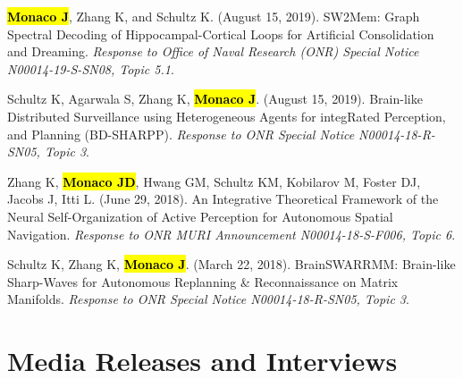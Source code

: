 \documentclass[10pt]{article}
\newcommand{\unpubtitle}[1]{{\color{hopkinsblue} #1}}
\newcommand{\joehl}[1]{\hl{\textbf{#1}}}
\begin{document}
\begin{description}
  \item \joehl{Monaco J}, Zhang K, and Schultz K. (August 15, 2019).
    \unpubtitle{SW2Mem: Graph Spectral Decoding of Hippocampal-Cortical Loops for
      Artificial Consolidation and Dreaming}. \emph{Response to Office of Naval
    Research (ONR) Special Notice N00014-19-S-SN08, Topic 5.1}.
  \item Schultz K, Agarwala S, Zhang K, \joehl{Monaco J}. (August 15, 2019).
    \unpubtitle{Brain-like Distributed Surveillance using Heterogeneous Agents for
      integRated Perception, and Planning (BD-SHARPP)}. \emph{Response to ONR Special
    Notice N00014-18-R-SN05, Topic 3}.
  \item Zhang K, \joehl{Monaco JD}, Hwang GM, Schultz KM, Kobilarov M, Foster
    DJ, Jacobs J, Itti L. (June 29, 2018). \unpubtitle{An Integrative Theoretical
      Framework of the Neural Self-Organization of Active Perception for Autonomous
      Spatial Navigation}. \emph{Response to ONR MURI Announcement N00014-18-S-F006,
    Topic 6}.
  \item Schultz K, Zhang K, \joehl{Monaco J}. (March 22, 2018).
    \unpubtitle{BrainSWARRMM: Brain-like Sharp-Waves for Autonomous Replanning
      \& Reconnaissance on Matrix Manifolds}. \emph{Response to ONR Special Notice
    N00014-18-R-SN05, Topic 3}.
\end{description}

\section*{Media Releases and Interviews}
\end{document}
